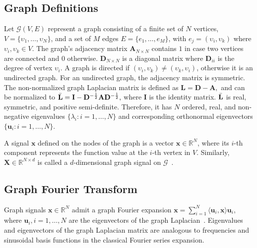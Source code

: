 \documentclass[runningheads]{llncs}
\newcommand{\mat}[1]{\ensuremath{\mathbf{#1}}}
\begin{document}
\subsection{Graph Definitions}
Let $\mathcal{G}(V, E)$ represent a graph consisting of a finite set of $N$ vertices, $V =\{\upsilon_1, \dots, 	\upsilon_N \}$, and a set of $M$ edges $E  =\{e_1, \dots, 	e_M \}$, with $e_j = (\upsilon_{i}, \upsilon_{k})$ where $\upsilon_{i}, \upsilon_{k} \in V$.
The graph's adjacency matrix $\mathbf{A}_{N \times N}$ contains $1$ in case two vertices are connected and $0$ otherwise. 
$\mathbf{D}_{N \times N}$ is a diagonal matrix where $\mathbf{D}_{ii}$ is the degree of vertex $\upsilon_{i}$.
A graph is directed if $(\upsilon_i, \upsilon_k) \neq (\upsilon_k, \upsilon_i)$, otherwise it is an undirected graph. For an undirected graph, the adjacency matrix is symmetric.
The non-normalized graph Laplacian matrix is defined as $\mat{L} = \mat{D} - \mat{A},$
and can be normalized to $\Bar{\mat{L}} = \mat{I} - \mat{D}^{-\frac{1}{2}}\mat{A}\mat{D}^{-\frac{1}{2}},$
where $\mathbf{I}$ is the identity matrix. 
$\Bar{\mathbf{L}}$ is  real, symmetric, and positive semi-definite. Therefore, it has $N$ ordered, real, and non-negative eigenvalues $\{\lambda_i : i = 1, \dots , N \}$ and corresponding orthonormal eigenvectors $\{\mathbf{u}_i : i = 1, \dots , N \}$. 

A signal $\mathbf{x}$ defined on the nodes of the graph is a vector $\mathbf{x} \in \mathbb{R}^N$, where its $i$-th component represents the function value at the $i$-th vertex in $V$. Similarly, $\mathbf{X} \in \mathbb{R}^{N \times d}$ is called a $d$-dimensional graph signal on $\mathcal{G}$~\cite{shuman2013emerging}. 
\subsection{Graph Fourier Transform}
Graph signals $\textstyle\mathbf{x} \in \mathbb{R}^N$ admit a graph Fourier expansion $\mathbf{x}=\sum_{i=1}^N \langle \mathbf{u}_{i},\mathbf{x}\rangle \mathbf{u}_i$, where $\mathbf{u}_i, i=1,\dots,N$ are the eigenvectors of the  graph Laplacian~\cite{shuman2013emerging}. Eigenvalues and eigenvectors of the graph Laplacian matrix are analogous to frequencies and sinusoidal basis functions in the classical Fourier series expansion. 
\end{document}
